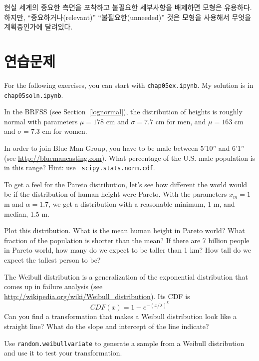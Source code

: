 현실 세계의 중요한 측면을 포착하고 불필요한 세부사항을 배제하면 모형은 유용하다. 하지만, ``중요하거나(relevant)'' ``불필요한(unneeded)'' 것은 모형을 사용해서 무엇을 계획중인가에 달려있다.

\section{연습문제}

For the following exercises, you can start with \verb"chap05ex.ipynb".
My solution is in \verb"chap05soln.ipynb".

\begin{exercise}
In the BRFSS (see Section~\ref{lognormal}), the distribution of
heights is roughly normal with parameters $\mu = 178$ cm and
$\sigma = 7.7$ cm for men, and $\mu = 163$ cm and $\sigma = 7.3$ cm for
women.

In order to join Blue Man Group, you have to be male between 5'10''
and 6'1'' (see \url{http://bluemancasting.com}).  What percentage of
the U.S. male population is in this range?  Hint: use {\tt
  scipy.stats.norm.cdf}.

\end{exercise}


\begin{exercise}
To get a feel for the Pareto distribution, let's see how different
the world
would be if the distribution of human height were Pareto.
With the parameters $x_{m} = 1$ m and $\alpha = 1.7$, we
get a distribution with a reasonable minimum, 1 m,
and median, 1.5 m.

Plot this distribution.  What is the mean human height in Pareto
world?  What fraction of the population is shorter than the mean?  If
there are 7 billion people in Pareto world, how many do we expect to
be taller than 1 km?  How tall do we expect the tallest person to be?

\end{exercise}


\begin{exercise}
\label{weibull}

The Weibull distribution is a generalization of the exponential
distribution that comes up in failure analysis
(see \url{http://wikipedia.org/wiki/Weibull_distribution}).  Its CDF is
%
\[ CDF(x) = 1 - e^{-(x / \lambda)^k} \]
%
Can you find a transformation that makes a Weibull distribution look
like a straight line?  What do the slope and intercept of the
line indicate?

Use {\tt random.weibullvariate} to generate a sample from a
Weibull distribution and use it to test your transformation.

\end{exercise}


